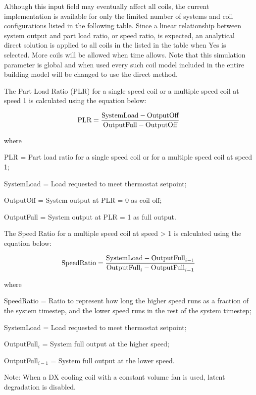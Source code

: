 Although this input field may eventually affect all coils, the current implementation is available for only the limited number of systems and coil configurations listed in the following table. Since a linear relationship between system output and part load ratio, or speed ratio, is expected, an analytical direct solution is applied to all coils in the listed in the table when Yes is selected. More coils will be allowed when time allows. Note that this simulation parameter is global and when used every such coil model included in the entire building model will be changed to use the direct method.

The Part Load Ratio (PLR) for a single speed coil or a multiple speed coil at speed 1 is calculated using the equation below:

\begin{equation}
    \textnormal{PLR} = \frac{\textnormal{SystemLoad} - \textnormal{OutputOff}}{\textnormal{OutputFull} - \textnormal{OutputOff}}
\end{equation}

where

PLR = Part load ratio for a single speed coil or for a multiple speed coil at speed 1;

SystemLoad = Load requested to meet thermostat setpoint;

OutputOff = System output at PLR = 0 as coil off;

OutputFull = System output at PLR = 1 as full output.

The Speed Ratio for a multiple speed coil at speed > 1 is calculated using the equation below:

\begin{equation}
    \textnormal{SpeedRatio} = \frac{\textnormal{SystemLoad} - \textnormal{OutputFull}_{i-1}}{\textnormal{OutputFull}_{i} - \textnormal{OutputFull}_{i-1}}
\end{equation}

where

SpeedRatio = Ratio to represent how long the higher speed runs as a fraction of the system timestep, and the lower speed runs in the rest of the system timestep;

SystemLoad = Load requested to meet thermostat setpoint;

OutputFull$_{i}$ = System full output at the higher speed;

OutputFull$_{i-1}$ = System full output at the lower speed.

Note: When a DX cooling coil with a constant volume fan is used, latent degradation is disabled.

